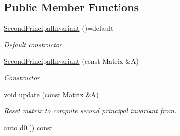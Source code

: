 \subsection*{Public Member Functions}
\begin{DoxyCompactItemize}
\item 
\hypertarget{classFunG_1_1LinearAlgebra_1_1SecondPrincipalInvariant_a959bed7e38dae7003556a582a978cdb1}{\hyperlink{classFunG_1_1LinearAlgebra_1_1SecondPrincipalInvariant_a959bed7e38dae7003556a582a978cdb1}{Second\-Principal\-Invariant} ()=default}\label{classFunG_1_1LinearAlgebra_1_1SecondPrincipalInvariant_a959bed7e38dae7003556a582a978cdb1}

\begin{DoxyCompactList}\small\item\em Default constructor. \end{DoxyCompactList}\item 
\hyperlink{classFunG_1_1LinearAlgebra_1_1SecondPrincipalInvariant_ab04cf850a3475333f64e5e4d572d0685}{Second\-Principal\-Invariant} (const Matrix \&A)
\begin{DoxyCompactList}\small\item\em Constructor. \end{DoxyCompactList}\item 
\hypertarget{classFunG_1_1LinearAlgebra_1_1SecondPrincipalInvariant_a511f6f78f64fc8f1fe9315c8256e285f}{void \hyperlink{classFunG_1_1LinearAlgebra_1_1SecondPrincipalInvariant_a511f6f78f64fc8f1fe9315c8256e285f}{update} (const Matrix \&A)}\label{classFunG_1_1LinearAlgebra_1_1SecondPrincipalInvariant_a511f6f78f64fc8f1fe9315c8256e285f}

\begin{DoxyCompactList}\small\item\em Reset matrix to compute second principal invariant from. \end{DoxyCompactList}\item 
\hypertarget{classFunG_1_1LinearAlgebra_1_1SecondPrincipalInvariant_af7df9e46d302c070777db975c1161df0}{auto \hyperlink{classFunG_1_1LinearAlgebra_1_1SecondPrincipalInvariant_af7df9e46d302c070777db975c1161df0}{d0} () const }\label{classFunG_1_1LinearAlgebra_1_1SecondPrincipalInvariant_af7df9e46d302c070777db975c1161df0}


\end{DoxyCompactItemize}
